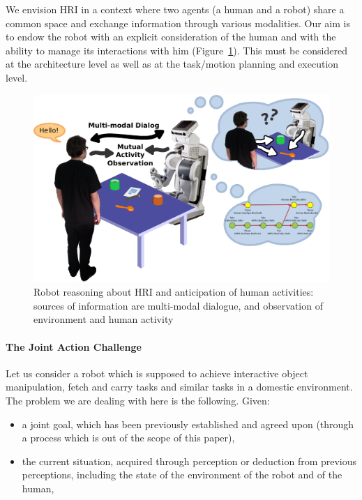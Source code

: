 \documentclass[preprint,5p]{elsarticle}
\begin{document}

We envision HRI in a context where two agents (a human and a robot)
share a common space and exchange information through various
modalities. Our aim is to endow the robot with an explicit
consideration of the human and with the ability to manage its
interactions with him (Figure~\ref{fig:hri-dec}). This must be
considered at the architecture level as well as at the task/motion
planning and execution level. 

\begin{figure}[htb]
\centering
\includegraphics[width=0.9\columnwidth]{figs/grounding_robot.pdf}
\caption{Robot reasoning about HRI and anticipation of human activities:
  sources of information are multi-modal dialogue, and observation of
  environment and human activity}
\label{fig:hri-dec}
\end{figure}

\paragraph{The Joint Action Challenge} Let us consider a robot which is
supposed to achieve interactive object manipulation, fetch and carry tasks and
similar tasks in a domestic environment. The problem we are dealing with here
is the following. Given:

\begin {itemize}
\item a joint goal, which has been previously established and agreed
  upon (through a process which is out of the scope of this paper),
\item the current situation, acquired through perception or
  deduction from previous perceptions, including the state of the
  environment of the robot and of the human,
\end {itemize}
\end{document}
